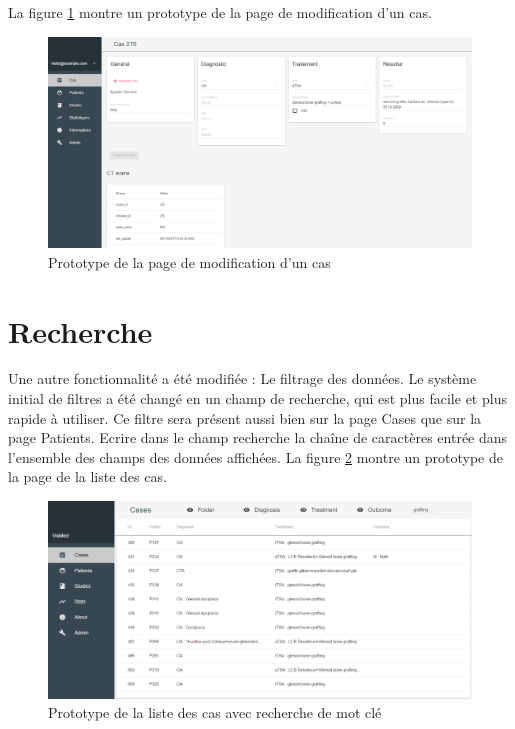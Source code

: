 		La figure \ref{proto2_1} montre un prototype de la page de modification d'un cas.

		\begin{figure}[!h]
			\centering
			\includegraphics[width=1\textwidth]{images/realisation/proto2_1}
			\caption{Prototype de la page de modification d'un cas}
			\label{proto2_1}
		\end{figure}

	\section{Recherche}

		Une autre fonctionnalité a été modifiée : Le filtrage des données. Le système initial de filtres a été changé en un champ de recherche, qui est plus facile et plus rapide à utiliser. Ce filtre sera présent aussi bien sur la page Cases que sur la page Patients. Ecrire dans le champ recherche la chaîne de caractères entrée dans l'ensemble des champs des données affichées.
		La figure \ref{proto2_2} montre un prototype de la page de la liste des cas.

		\begin{figure}[!h]
			\centering
			\includegraphics[width=1\textwidth]{images/realisation/proto2_2}
			\caption{Prototype de la liste des cas avec recherche de mot clé}
			\label{proto2_2}
		\end{figure}


